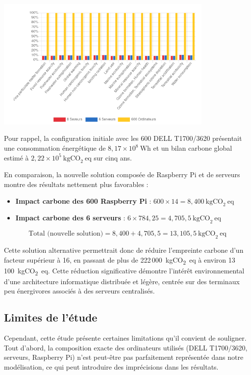 \includegraphics[width=0.8\textwidth]{images/imcomp.png}


Pour rappel, la configuration initiale avec les 600 DELL T1700/3620 présentait une consommation énergétique de \(8{,}17 \times 10^8~\text{Wh}\) et un bilan carbone global estimé à \(2{,}22 \times 10^5~\text{kgCO}_2~\text{eq}\) sur cinq ans.

En comparaison, la nouvelle solution composée de Raspberry Pi et de serveurs montre des résultats nettement plus favorables :
\begin{itemize}
    \item \textbf{Impact carbone des 600 Raspberry Pi} : \(600 \times 14 = 8{,}400~\text{kgCO}_2~\text{eq}\)
    \item \textbf{Impact carbone des 6 serveurs} : \(6 \times 784{,}25 = 4{,}705{,}5~\text{kgCO}_2~\text{eq}\)
\end{itemize}

\[
\text{Total (nouvelle solution)} = 8{,}400 + 4{,}705{,}5 = 13{,}105{,}5~\text{kgCO}_2~\text{eq}
\]

Cette solution alternative permettrait donc de réduire l’empreinte carbone d’un facteur supérieur à 16, en passant de plus de 222\,000~kgCO\textsubscript{2}~eq à environ 13\,100~kgCO\textsubscript{2}~eq. Cette réduction significative démontre l’intérêt environnemental d’une architecture informatique distribuée et légère, centrée sur des terminaux peu énergivores associés à des serveurs centralisés.

\subsection*{Limites de l’étude}

Cependant, cette étude présente certaines limitations qu’il convient de souligner. Tout d’abord, la composition exacte des ordinateurs utilisés (DELL T1700/3620, serveurs, Raspberry Pi) n’est peut-être pas parfaitement représentée dans notre modélisation, ce qui peut introduire des imprécisions dans les résultats.

